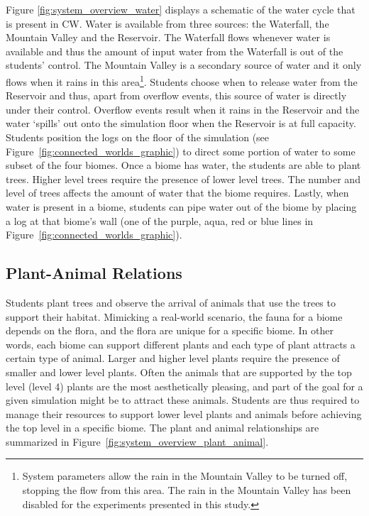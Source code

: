 Figure \ref{fig:system_overview_water} displays a schematic of the water cycle that is present in CW. Water is available from three sources: the Waterfall, the Mountain Valley and the Reservoir. The Waterfall flows whenever water is available and thus the amount of input water from the Waterfall is out of the students' control. The Mountain Valley is a secondary source of water and it only flows when it rains in this area\footnote{System parameters allow the rain in the Mountain Valley to be turned off, stopping the flow from this area. The rain in the Mountain Valley has been disabled for the experiments presented in this study.}. Students choose when to release water from the Reservoir and thus, apart from overflow events, this source of water is directly under their control. Overflow events result when it rains in the Reservoir and the water `spills' out onto the simulation floor when the Reservoir is at full capacity. Students position the logs on the floor of the simulation (see Figure~\ref{fig:connected_worlds_graphic}) to direct some portion of water to some subset of the four biomes. Once a biome has water, the students are able to plant trees. Higher level trees require the presence of lower level trees. The number and level of trees affects the amount of water that the biome requires. Lastly, when water is present in a biome, students can pipe water out of the biome by placing a log at that biome's wall (one of the purple, aqua, red or blue lines in Figure~\ref{fig:connected_worlds_graphic}).



\subsection{Plant-Animal Relations}

Students plant trees and observe the arrival of animals that use the trees to support their habitat. Mimicking a real-world scenario, the fauna for a biome depends on the flora, and the flora are unique for a specific biome. In other words, each biome can support different plants and each type of plant attracts a certain type of animal. Larger and higher level plants require the presence of smaller and lower level plants. Often the animals that are supported by the top level (level 4) plants are the most aesthetically pleasing, and part of the goal for a given simulation might be to attract these animals. Students are thus required to manage their resources to support lower level plants and animals before achieving the top level in a specific biome. The plant and animal relationships are summarized in Figure~\ref{fig:system_overview_plant_animal}.

